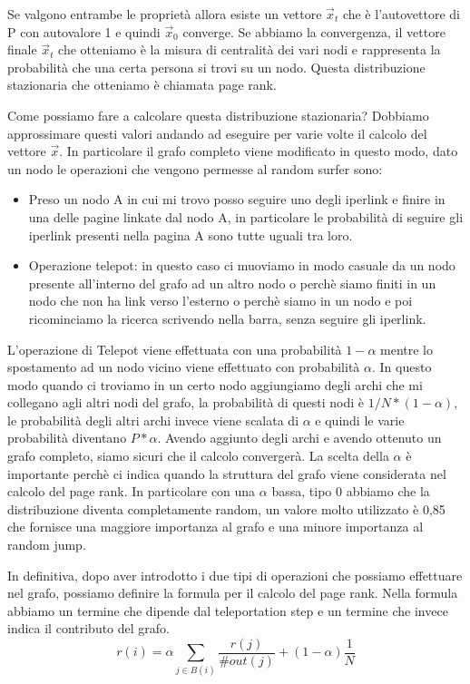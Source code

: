 \documentclass[14pt]{extreport}
\begin{document}
Se valgono entrambe le proprietà allora esiste un vettore $\vec{x}_t$ che è l'autovettore di P con autovalore 1 e quindi $\vec{x}_0$ converge.
Se abbiamo la convergenza, il vettore finale $\vec{x}_t$ che otteniamo è la misura di centralità dei vari nodi e rappresenta la probabilità che una certa persona si trovi su un nodo.
Questa distribuzione stazionaria che otteniamo è chiamata page rank.

Come possiamo fare a calcolare questa distribuzione stazionaria?
Dobbiamo approssimare questi valori andando ad eseguire per varie volte il calcolo del vettore $\vec{x}$.
In particolare il grafo completo viene modificato in questo modo, dato un nodo le operazioni che vengono permesse al random surfer sono:
\begin{itemize}
    \item Preso un nodo A in cui mi trovo posso seguire uno degli iperlink e finire in una delle pagine linkate dal nodo A, in particolare le probabilità di seguire gli iperlink presenti nella pagina A sono tutte uguali tra loro.
    \item Operazione telepot: in questo caso ci muoviamo in modo casuale da un nodo presente all'interno del grafo ad un altro nodo o perchè siamo finiti in un nodo che non ha link verso l'esterno o perchè siamo in un nodo e poi ricominciamo la ricerca scrivendo nella barra, senza seguire gli iperlink.
\end{itemize}

L'operazione di Telepot viene effettuata con una probabilità $1-\alpha$ mentre lo spostamento ad un nodo vicino viene effettuato con probabilità $\alpha$.
In questo modo quando ci troviamo in un certo nodo aggiungiamo degli archi che mi collegano agli altri nodi del grafo, la probabilità di questi nodi è $1/N*(1-\alpha)$, le probabilità degli altri archi invece viene scalata di $\alpha$ e quindi le varie probabilità diventano $P*\alpha$.
Avendo aggiunto degli archi e avendo ottenuto un grafo completo, siamo sicuri che il calcolo convergerà.
La scelta della $\alpha$ è importante perchè ci indica quando la struttura del grafo viene considerata nel calcolo del page rank. In particolare con una $\alpha$ bassa, tipo 0 abbiamo che la distribuzione diventa completamente random, un valore molto utilizzato è 0,85 che fornisce una maggiore importanza al grafo e una minore importanza al random jump.

In definitiva, dopo aver introdotto i due tipi di operazioni che possiamo effettuare nel grafo, possiamo definire la formula per il calcolo del page rank.
Nella formula abbiamo un termine che dipende dal teleportation step e un termine che invece indica il contributo del grafo.
\newline
\begin{equation}
    r(i) = \alpha \sum\limits_{j \in B(i)} {\frac{r(j)}{\#out(j)}} + (1-\alpha)\frac{1}{N} 
\end{equation}
\end{document}
